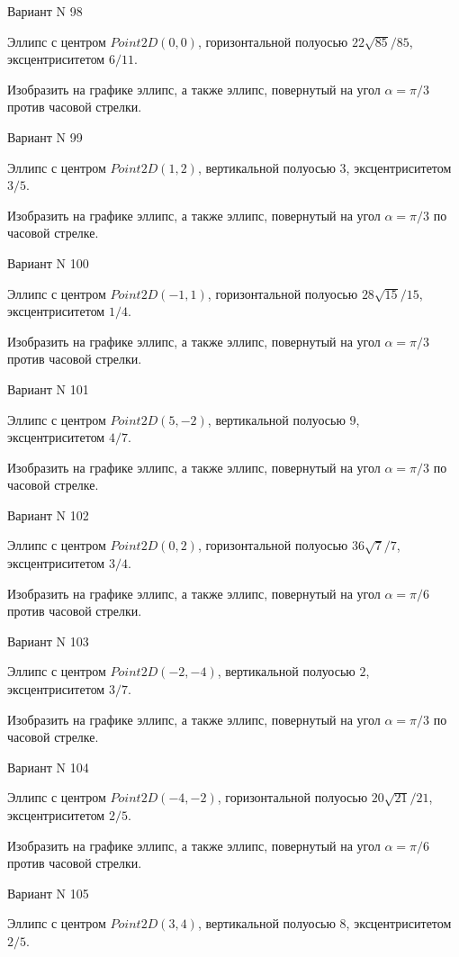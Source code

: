 \documentclass[11pt]{report}
\begin{document}
Вариант N 98

Эллипс с центром $Point2D\left(0, 0\right)$, горизонтальной полуосью $22 \sqrt{85} / 85$, эксцентриситетом $6 / 11$.

    Изобразить на графике эллипс, а также эллипс, повернутый на угол $\alpha = $$\pi / 3$ против часовой стрелки.

Вариант N 99

Эллипс с центром $Point2D\left(1, 2\right)$, вертикальной полуосью $3$, эксцентриситетом $3 / 5$.

    Изобразить на графике эллипс, а также эллипс, повернутый на угол $\alpha = $$\pi / 3$ по часовой стрелке.

Вариант N 100

Эллипс с центром $Point2D\left(-1, 1\right)$, горизонтальной полуосью $28 \sqrt{15} / 15$, эксцентриситетом $1 / 4$.

    Изобразить на графике эллипс, а также эллипс, повернутый на угол $\alpha = $$\pi / 3$ против часовой стрелки.

Вариант N 101

Эллипс с центром $Point2D\left(5, -2\right)$, вертикальной полуосью $9$, эксцентриситетом $4 / 7$.

    Изобразить на графике эллипс, а также эллипс, повернутый на угол $\alpha = $$\pi / 3$ по часовой стрелке.

Вариант N 102

Эллипс с центром $Point2D\left(0, 2\right)$, горизонтальной полуосью $36 \sqrt{7} / 7$, эксцентриситетом $3 / 4$.

    Изобразить на графике эллипс, а также эллипс, повернутый на угол $\alpha = $$\pi / 6$ против часовой стрелки.

Вариант N 103

Эллипс с центром $Point2D\left(-2, -4\right)$, вертикальной полуосью $2$, эксцентриситетом $3 / 7$.

    Изобразить на графике эллипс, а также эллипс, повернутый на угол $\alpha = $$\pi / 3$ по часовой стрелке.

Вариант N 104

Эллипс с центром $Point2D\left(-4, -2\right)$, горизонтальной полуосью $20 \sqrt{21} / 21$, эксцентриситетом $2 / 5$.

    Изобразить на графике эллипс, а также эллипс, повернутый на угол $\alpha = $$\pi / 6$ против часовой стрелки.

Вариант N 105

Эллипс с центром $Point2D\left(3, 4\right)$, вертикальной полуосью $8$, эксцентриситетом $2 / 5$.
\end{document}
